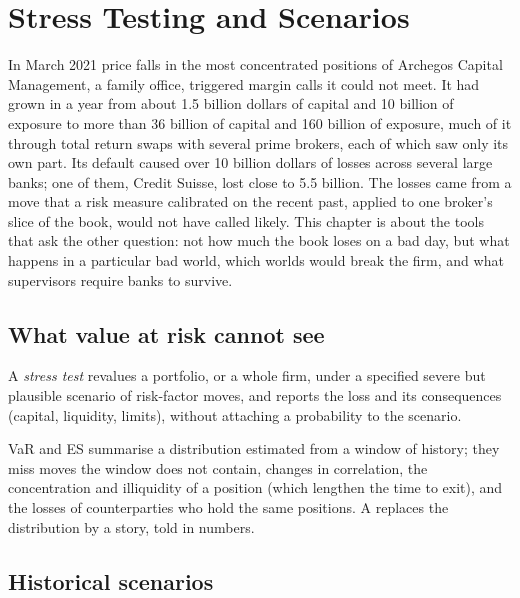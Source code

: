 \chapter{Stress Testing and Scenarios}\label{ch:rc:stress-testing-and-scenarios}

In March 2021 price falls in the most concentrated positions of Archegos Capital
Management, a family office, triggered margin calls it could not meet. It had grown in a year
from about 1.5 billion dollars of capital and 10 billion of exposure to more than 36 billion of
capital and 160 billion of exposure, much of it through total return swaps with several prime
brokers, each of which saw only its own part. Its default caused over 10 billion dollars of
losses across several large banks; one of them, Credit Suisse, lost close to 5.5 billion. The losses came from a
move that a risk measure calibrated on the recent past, applied to one broker's slice of the
book, would not have called likely. This chapter is about the tools that ask the other
question: not how much the book loses on a bad day, but what happens in a particular bad
world, which worlds would break the firm, and what supervisors require banks to survive.

\section{What value at risk cannot see}

\begin{definition}\label{def:rc:stress-testing-and-scenarios:stress}
A \emph{stress test} revalues a portfolio, or a whole firm, under a
specified severe but plausible scenario of risk-factor moves, and reports the loss and its
consequences (capital, liquidity, limits), without attaching a probability to the scenario.
\end{definition}

VaR and ES summarise a distribution estimated from a window of history; they miss moves the
window does not contain, changes in correlation, the concentration and illiquidity of a
position (which lengthen the time to exit), and the losses of counterparties who hold the same
positions. A  replaces the distribution by a story, told in numbers.

\section{Historical scenarios}

